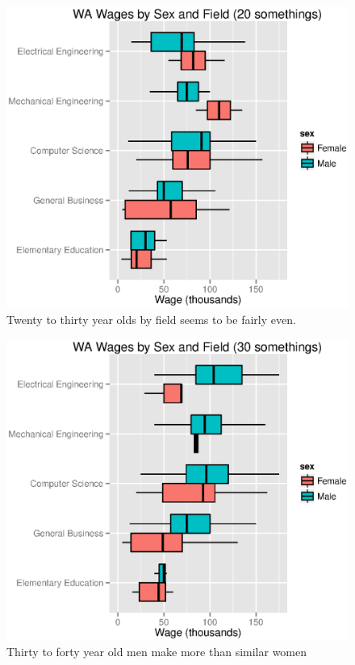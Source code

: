\documentclass{exam}
\begin{document}
  
  \begin{figure}[H]
    \centering
    \includegraphics{figures/wa_20s_by_field_and_sex.eps}
    \caption{Twenty to thirty year olds by field seems to be fairly even.}
  \end{figure}

  \begin{figure}[H]
    \centering
    \includegraphics{figures/wa_30s_by_field_and_sex.eps}
    \caption{ Thirty to forty year old men make more than similar women }
  \end{figure}
\end{document}
